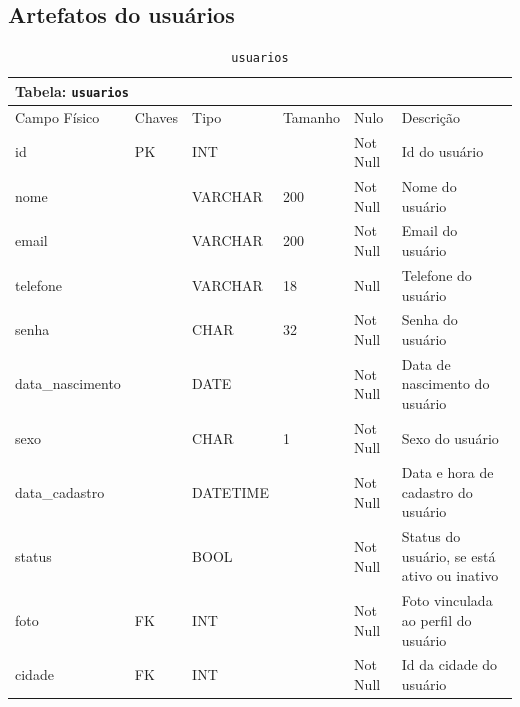 \documentclass[12pt,a4paper]{article}
\begin{document}
\subsection{Artefatos do usuários}


\begin{center}
\begin{table}[h!]
	\caption{\texttt{usuarios}}
	\label{tabela:usuarios}
	\begin{tabular}{|p{2.5cm}|p{1cm}|p{1.25cm}|p{1.75cm}|p{1.25cm}|p{5cm}|}\hline	
		\multicolumn{6}{|p{16cm}|}{\cellcolor{cinzaClaro}  \centering Tabela: \texttt{usuarios}} \\ \hline %
		{\small Campo Físico}   & {\small Chaves} & {\small Tipo} & {\small Tamanho} & {\small Nulo} & {\small Descrição}\\\hline %
		
		{\tiny id} & {\tiny PK} & {\tiny INT} & {\tiny } & {\tiny Not Null} &{\tiny Id do usuário}\\\hline
		{\tiny nome} & {\tiny } & {\tiny VARCHAR} & {\tiny 200} & {\tiny Not Null} &{\tiny  Nome do usuário}\\\hline
		{\tiny email} & {\tiny } & {\tiny VARCHAR} & {\tiny 200} & {\tiny Not Null} &{\tiny Email do usuário}\\\hline
		{\tiny telefone} & {\tiny } & {\tiny VARCHAR } & {\tiny 18} & {\tiny  Null} &{\tiny Telefone do usuário}\\\hline
		{\tiny senha} & {\tiny } & {\tiny CHAR} & {\tiny 32} & {\tiny Not Null} &{\tiny Senha do usuário}\\\hline
		{\tiny data\_nascimento} & {\tiny } & {\tiny DATE} & {\tiny } & {\tiny Not Null} &{\tiny Data de nascimento do usuário}\\\hline
		{\tiny sexo} & {\tiny } & {\tiny CHAR} & {\tiny 1} & {\tiny Not Null} &{\tiny Sexo do usuário}\\\hline
		{\tiny data\_cadastro} & {\tiny } & {\tiny DATETIME} & {\tiny } & {\tiny Not Null} &{\tiny Data e hora de cadastro do usuário}\\\hline
		{\tiny status} & {\tiny } & {\tiny BOOL} & {\tiny } & {\tiny Not Null} &{\tiny Status do usuário, se está ativo ou inativo}\\\hline		
		{\tiny foto} & {\tiny FK} & {\tiny INT} & {\tiny } & {\tiny Not Null} &{\tiny Foto vinculada ao perfil do usuário}\\\hline
		{\tiny cidade} & {\tiny FK} & {\tiny INT} & {\tiny } & {\tiny Not Null} &{\tiny Id da cidade do usuário}\\\hline
		
			
	\end{tabular}
\end{table}	
\end{center}
\end{document}
